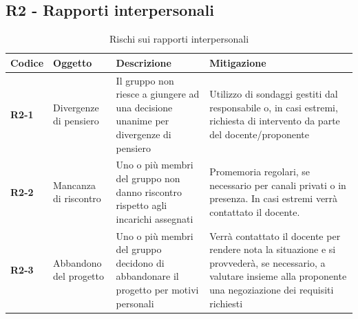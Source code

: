 \documentclass[a4paper,12pt]{article}
\begin{document}
    \subsection{R2 - Rapporti interpersonali}
        \begin{table}[H]
        \label{tab:r2}
            \begin{tabularx}{\textwidth}{|l|L|L|L|}
            \hline
            \textbf{Codice} & \textbf{Oggetto} & \textbf{Descrizione} & \textbf{Mitigazione}\\
            \hline
            \textbf{R2-1} & Divergenze di pensiero & Il gruppo non riesce a giungere ad una decisione unanime per divergenze di pensiero & Utilizzo di sondaggi gestiti dal responsabile o, in casi estremi, richiesta di intervento da parte del docente/proponente\\
            \hline
            \textbf{R2-2} & Mancanza di riscontro & Uno o più membri del gruppo non danno riscontro rispetto agli incarichi assegnati & Promemoria regolari, se necessario per canali privati o in presenza. In casi estremi verrà contattato il docente.\\
            \hline
            \textbf{R2-3} & Abbandono del progetto & Uno o più membri del gruppo decidono di abbandonare il progetto per motivi personali & Verrà contattato il docente per rendere nota la situazione e si provvederà, se necessario, a valutare insieme alla proponente una negoziazione dei requisiti richiesti \\
            \hline
            \end{tabularx}
            \caption{Rischi sui rapporti interpersonali}
        \end{table}
        
\end{document}
